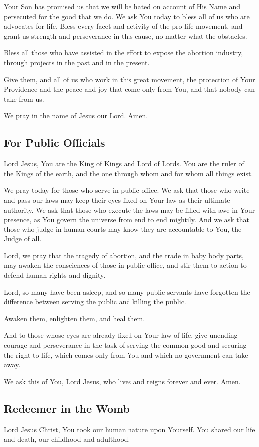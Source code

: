 \documentclass[12pt]{article}
\newcommand{\prayertitle}[1]{\subsection{#1}}
\begin{document}
Your Son has promised us that we will be hated on account of His Name and persecuted for the good that we do.
We ask You today to bless all of us who are advocates for life.
Bless every facet and activity of the pro-life movement, and grant us strength and perseverance in this cause, no matter what the obstacles.

Bless all those who have assisted in the effort to expose the abortion industry, through projects in the past and in the present.

Give them, and all of us who work in this great movement, the protection of Your Providence and the peace and joy that come only from You, and that nobody can take from us.

We pray in the name of Jesus our Lord. Amen.

\prayertitle{For Public Officials}
Lord Jesus,
You are the King of Kings and Lord of Lords.
You are the ruler of the Kings of the earth, and the one through whom and for whom all things exist.

We pray today for those who serve in public office.
We ask that those who write and pass our laws may keep their eyes fixed on Your law as their ultimate authority.
We ask that those who execute the laws may be filled with awe in Your presence, as You govern the universe from end to end mightily.
And we ask that those who judge in human courts may know they are accountable to You, the Judge of all.

Lord, we pray that the tragedy of abortion, and the trade in baby body parts, may awaken the consciences of those in public office, and stir them to action to defend human rights and dignity.

Lord, so many have been asleep, and so many public servants have forgotten the difference between serving the public and killing the public.

Awaken them, enlighten them, and heal them.

And to those whose eyes are already fixed on Your law of life, give unending courage and perseverance in the task of serving the common good and securing the right to life, which comes only from You and which no government can take away.

We ask this of You, Lord Jesus, who lives and reigns forever and ever. Amen.

\prayertitle{Redeemer in the Womb}
Lord Jesus Christ, You took our human nature upon Yourself.
You shared our life and death, our childhood and adulthood.
\end{document}
